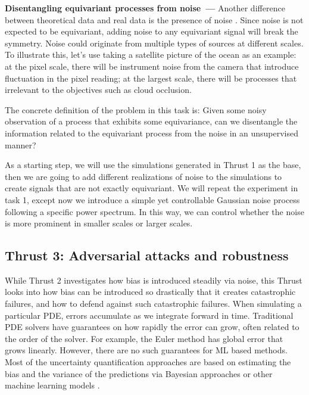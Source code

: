 \documentclass[11pt]{article}
\renewcommand{\paragraph}[1]{\medskip\par\noindent\textbf{#1~---}}
\begin{document}
\paragraph{Disentangling equivariant processes from noise}
Another difference between theoretical data and real data is the presence of noise \cite{Wang2022ApproximatelyEN}. Since noise is not expected to be equivariant, adding noise to any equivariant signal will break the symmetry. Noise could originate from multiple types of sources at different scales. To illustrate this, let's use taking a satellite picture of the ocean as an example: at the pixel scale, there will be instrument noise from the camera that introduce fluctuation in the pixel reading; at the largest scale, there will be processes that irrelevant to the objectives such as cloud occlusion. 

The concrete definition of the problem in this task is: Given some noisy observation of a process that exhibits some equivariance, can we disentangle the information related to the equivariant process from the noise in an unsupervised manner?

As a starting step, we will use the simulations generated in Thrust 1 as the base, then we are going to add different realizations of noise to the simulations to create signals that are not exactly equivariant.  We will repeat the experiment in task 1, except now we introduce a simple yet controllable Gaussian noise process following a specific power spectrum. In this way, we can control whether the noise is more prominent in smaller scales or larger scales. 

\subsection{Thrust 3: Adversarial attacks and robustness}

While Thrust 2 investigates how bias is introduced steadily via noise, this Thrust looks into how bias can be introduced so drastically that it creates catastrophic failures, and how to defend against such catastrophic failures.
When simulating a particular PDE, errors accumulate as we integrate forward in time.
Traditional PDE solvers have guarantees on how rapidly the error can grow, often related to the order of the solver. For example, the Euler method has global error that grows linearly.  However, there are no such guarantees for ML based methods. Most of the uncertainty quantification approaches are based on estimating the bias and the variance of the predictions via Bayesian approaches or other machine learning models \cite{perezhogin2023generative}.
\end{document}
